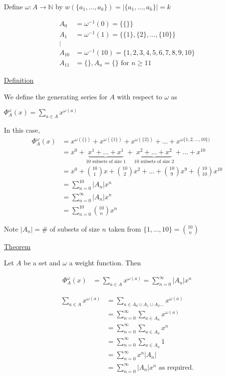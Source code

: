 \documentclass{article}
\begin{document}
Define $\omega : A \to \mathbb{N}$ by $w(\{a_1,\ldots,a_k\}) = |\{a_1,\ldots,a_k\}| = k$

\begin{align*}
    A_0 &= \omega^{-1}(0) = \{\{\}\} \\
    A_1 &= \omega^{-1}(1) = \{\{1\},\{2\},\ldots,\{10\}\} \\
    \vdots \\
    A_{10} &= \omega^{-1}(10) = \{1,2,3,4,5,6,7,8,9,10\}\\
    A_{11} &= \{\}, A_n = \{\} \text{ for } n \ge 11
\end{align*}

\underline{Definition}

We define the generating series for $A$ with respect to $\omega$ as

$\Phi_{A}^{\omega}(x) = \sum_{a \in A}^{}x^{\omega(a)}$

In this case,
\begin{align*}
\Phi_{A}^{\omega}(x) &= x^{\omega(\{\})} + x^{\omega(\{1\})} + x^{\omega(\{2\})} + \ldots + x^{\omega\{1,2,\ldots,10\})} \\
&= x^0 + \underbrace{x^1 + \ldots + x^1}_{10 \text{ subsets of size } 1} + \underbrace{x^2 + \ldots + x^2}_{10 \text{ subsets of size } 2} + \ldots + x^{10} \\
&= x^0 + \binom{10}{1}x + \binom{10}{2}x^2 + \ldots + \binom{10}{9}x^9 + \binom{10}{10}x^{10} \\
&= \sum_{n=0}^{10}|A_n|x^n \\
&= \sum_{n=0}^{\infty}|A_n|x^n \\
&= \sum_{n=0}^{10}\binom{10}{n}x^n
\end{align*}

Note $|A_n| = \#$ of subsets of size $n$ taken from $\{1,\ldots,10\} = \binom{10}{n}$

\underline{Theorem}

Let $A$ be a set and $\omega$ a weight function. Then

\begin{align*}
    \Phi_{A}^{\omega}(x) &= \sum_{a \in A}^{}x^{\omega(a)} = \sum_{n=0}^{\infty}|A_n|x^{n}
\end{align*}

\begin{align*}
    \sum_{a \in A}^{}x^{\omega(a)} &= \sum_{a \in A_0 \cup A_1 \cup A_2 \ldots}^{}x^{\omega(a)} \\
    &= \sum_{n=0}^{\infty}\sum_{a\in A_n}^{}x^{\omega(a)} \\
    &= \sum_{n=0}^{\infty}\sum_{a\in A_n}^{}x^{n} \\
    &= \sum_{n=0}^{\infty}\sum_{a\in A_n}1 \\
    &= \sum_{n=0}^{\infty}x^n|A_n| \\
    &= \sum_{n=0}^{\infty}|A_n|x^n \text{ as required.}
\end{align*}
\end{document}
